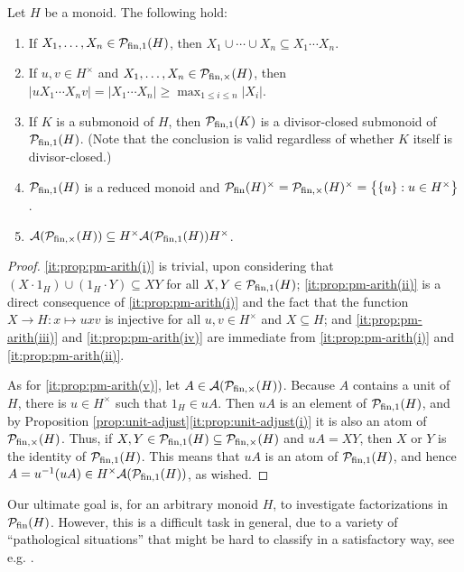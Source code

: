\begin{prop}\label{prop:pm-arith}
	Let $H$ be a monoid. The following hold:
	\begin{enumerate}[label={\rm (\roman{*})}]
		\item\label{it:prop:pm-arith(i)} If $X_1,\ldots,X_n\in \mathcal{P}_{\textrm{fin},1}(H)$, then $X_1 \cup \cdots \cup X_n \subseteq X_1 \cdots X_n$.
		\item\label{it:prop:pm-arith(ii)} If $u,v \in H^\times$ and $X_1,\ldots,X_n\in \mathcal{P}_{\textrm{fin},\times}(H)$, then $|uX_1 \cdots X_nv| = |X_1 \cdots X_n| \ge \max_{1 \le i \le n} |X_i|$.
		\item\label{it:prop:pm-arith(iii)} If $K$ is a submonoid of $H$, then $\mathcal{P}_{\textrm{fin}, 1}(K)$ is a divisor-closed submonoid of $\mathcal{P}_{\textrm{fin}, 1}(H)$. \textup{(}Note that the conclusion is valid regardless of whether $K$ itself is divisor-closed.\textup{)}
		\item \label{it:prop:pm-arith(iv)} $\mathcal{P}_{\textrm{fin}, 1}(H)$ is a reduced monoid and $\mathcal{P}_{\textrm{fin}}(H)^\times=\mathcal{P}_{\textrm{fin}, \times}(H)^\times = \bigl\{ \{u\}: u\in H^\times\bigr\}$.
		\item \label{it:prop:pm-arith(v)} $\mathcal{A}(\mathcal P_{{\textrm{fin}, \times}}(H)) \subseteq H^\times \mathcal{A}(\mathcal P_{{\textrm{fin}, 1}}(H)) H^\times$.
	\end{enumerate}
\end{prop}
%
\begin{proof}
	\ref{it:prop:pm-arith(i)} is trivial, upon considering that $(X \cdot 1_H) \cup (1_H \cdot Y) \subseteq XY$ for all $X, Y \in \mathcal P_{\textrm{fin}, 1}(H)$; \ref{it:prop:pm-arith(ii)} is a direct consequence of \ref{it:prop:pm-arith(i)} and the fact that the function $X \to H: x \mapsto uxv$ is injective for all $u, v \in H^\times$ and $X \subseteq H$; and \ref{it:prop:pm-arith(iii)} and \ref{it:prop:pm-arith(iv)} are immediate from \ref{it:prop:pm-arith(i)} and \ref{it:prop:pm-arith(ii)}.
	
	As for \ref{it:prop:pm-arith(v)}, let $A\in \mathcal{A}(\mathcal{P}_{\textrm{fin}, \times}(H))$.
	Because $A$ contains a unit of $H$, there is $u\in H^\times$ such that $1_H \in uA$.
	Then $uA$ is an element of $\mathcal{P}_{\textrm{fin}, 1}(H)$, and by Proposition \ref{prop:unit-adjust}\ref{it:prop:unit-adjust(i)} it is also an atom of $\mathcal{P}_{\textrm{fin}, \times}(H)$.
	Thus, if $X,Y\in \mathcal{P}_{\textrm{fin}, 1}(H) \subseteq \mathcal{P}_{\textrm{fin}, \times}(H)$ and $uA = XY$, then $X$ or $Y$ is the identity of $\mathcal{P}_{\textrm{fin}, 1}(H)$.
	This means that $uA$ is an atom of $\mathcal{P}_{\textrm{fin}, 1}(H)$, and hence $A=u^{-1}(uA)\in H^\times \mathcal{A}(\mathcal{P}_{\textrm{fin}, 1}(H))$, as wished.
\end{proof}

Our ultimate goal is, for an arbitrary monoid $H$, to investigate factorizations in $\mathcal{P}_{\textrm{fin}}(H)$. However, this is a difficult task in general, due to a variety of ``pathological situations'' that might be hard to classify in a satisfactory way, see e.g. \cite[Remark 3.3(ii)]{fan-tringali18}.

